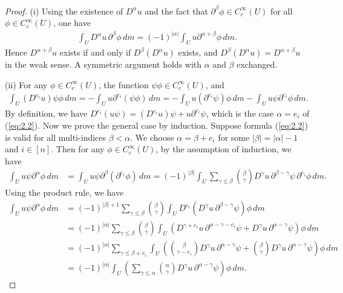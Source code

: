 \documentclass{article}
\numberwithin{equation}{section}
\theoremstyle{plain}
\theoremstyle{definition}
\begin{document}
\begin{proof}
(i) Using the existence of $D^\alpha u$ and the fact that $\partial^\beta\phi\in C_c^\infty(U)$ for all $\phi\in C_c^\infty(U)$, one have
\begin{align*}
	\int_U D^\alpha u\,\partial^\beta\phi\,dm=(-1)^{\vert\alpha\vert}\int_U u\partial^{\alpha+\beta}\phi\,dm.
\end{align*}
Hence $D^{\alpha+\beta}u$ exists if and only if $D^\beta(D^\alpha u)$ exists, and $D^\beta(D^\alpha u)=D^{\alpha+\beta}u$ in the weak sense. A symmetric argument holds with $\alpha$ and $\beta$ exchanged.

(ii) For any $\phi\in C_c^\infty(U)$, the function $\psi\phi\in C_c^\infty(U)$, and
\begin{align*}
	\int_U (D^{e_i}u)\psi\phi\,dm=-\int_U u\partial^{e_i}(\psi\phi)\,dm=-\int_U u(\partial^{e_i}\psi)\phi\,dm-\int_U u\psi\partial^{e_i}\phi\,dm.
\end{align*}
By definition, we have $D^{e_i}(u\psi)=(D^{e_i}u)\psi+u\partial^{e_i}\psi$, which is the case $\alpha=e_i$ of (\ref{eq:2.2}). Now we prove the general case by induction. Suppose formula (\ref{eq:2.2}) is valid for all multi-indices $\beta<\alpha$. We choose $\alpha=\beta+e_i$ for some $\vert\beta\vert=\vert\alpha\vert-1$ and $i\in[n]$. Then for any $\phi\in C_c^\infty(U)$, by the assumption of induction, we have
\begin{align*}
	\int_U u\psi\partial^\alpha\phi\,dm&=\int_Uu\psi \partial^\beta(\partial^{e_i}\phi)\,dm=(-1)^{\vert\beta\vert}\int_U\sum_{\gamma\leq\beta}{\beta\choose\gamma}D^\gamma u\,\partial^{\beta-\gamma}\psi\,\partial^{e_i}\phi\,dm.
\end{align*}
Using the product rule, we have
\begin{align*}
	\int_U u\psi\partial^\alpha\phi\,dm&=(-1)^{\vert\beta\vert+1}\sum_{\gamma\leq\beta}{\beta\choose\gamma}\int_U D^{e_i}(D^\gamma u\,\partial^{\beta-\gamma}\psi)\phi\,dm\\
	&=(-1)^{\vert\alpha\vert}\sum_{\gamma\leq\beta}{\beta\choose\gamma}\int_U\left(D^{\gamma+e_i}u\,\partial^{\alpha-\gamma-e_i}\psi+D^{\gamma}u\,\partial^{\alpha-\gamma}\psi\right)\phi\,dm\\
	&=(-1)^{\vert\alpha\vert}\sum_{\gamma\leq\beta+e_i}\int_U\left({\beta\choose{\gamma-e_i}}D^{\gamma}u\,\partial^{\alpha-\gamma}\psi+{\beta\choose\gamma}D^{\gamma}u\,\partial^{\alpha-\gamma}\psi\right)\phi\,dm\\
	&=(-1)^{\vert\alpha\vert}\int_U\left(\sum_{\gamma\leq\alpha} {\alpha\choose\gamma}D^{\gamma}u\,\partial^{\alpha-\gamma}\psi\right)\phi\,dm.
\end{align*}


\end{proof}
\end{document}
